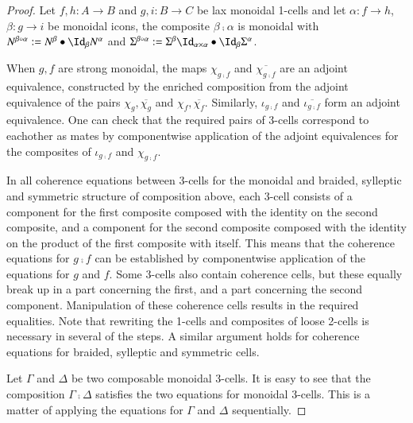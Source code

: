 \begin{proof}
Let $f,h: A \rightarrow B $ and $g,i: B \rightarrow C$ be lax monoidal 1-cells and let $\alpha: f \rightarrow h$, $\beta: g \rightarrow i$ be monoidal icons, the composite $\beta \comp \alpha$ is monoidal with $N^{\beta \comp \alpha}:= N^{\beta} \horc \looseid_{\beta} N^{\alpha}$ and $\Sigma^{\beta \comp \alpha}:= \Sigma^{\beta}\looseid_{\alpha \times \alpha} \horc \looseid_{\beta} \Sigma^{\alpha}$.

When $g,f$ are strong monoidal, the maps $\chi_{g \comp f}$ and $\overline{\chi_{g \comp f}}$ are an adjoint equivalence, constructed by the enriched composition from the adjoint equivalence of the pairs $\chi_g, \overline{\chi_g}$ and $\chi_f, \overline{\chi_f}$. Similarly, $\iota_{g \comp f}$ and $\overline{\iota_{g \comp f}}$ form an adjoint equivalence. One can check that the required pairs of 3-cells correspond to eachother as mates by componentwise application of the adjoint equivalences for the composites of $\iota_{g \comp f}$ and $\chi_{g \comp f}$.

In all coherence equations between 3-cells for the monoidal and braided, sylleptic and symmetric structure of composition above, each 3-cell consists of a component for the first composite  composed with the identity on the second composite, and a component for the second composite composed with the identity on the product of the first composite with itself. This means that the coherence equations for $g \comp f$  can be established by componentwise application of the equations for $g$ and $f$. Some 3-cells also contain coherence cells, but these equally break up in a part concerning the first, and a part concerning the second component. Manipulation of these coherence cells results in the required equalities. Note that rewriting the 1-cells and composites of loose 2-cells is necessary in several of the steps. A similar argument holds for coherence equations for braided, sylleptic and symmetric cells.

Let $\Gamma$ and $\Delta$ be two composable monoidal 3-cells. It is easy to see that the composition $\Gamma \comp \Delta$ satisfies the two equations for monoidal 3-cells. This is a matter of applying the equations for $\Gamma$ and $\Delta$ sequentially.
\end{proof}


